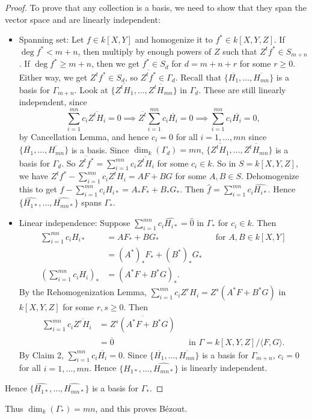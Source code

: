 \documentclass[12pt]{article}
\newcommand{\vbrack}[1]{\langle #1\rangle}
\theoremstyle{definition}
\begin{document}
\begin{proof}
    To prove that any collection is a basis, we need to show that they span the vector space and are linearly independent:
    \begin{itemize}
        \item Spanning set: Let $f\in k[X,Y]$ and homogenize it to $f^*\in k[X,Y,Z]$. If $\deg f^*<m+n$, then multiply by enough powers of $Z$ such that $Z^tf^*\in S_{m+n}$. If $\deg f^*\geq m+n$, then we get $f^*\in S_d$ for $d=m+n+r$ for some $r\geq0$. Either way, we get $Z^tf^*\in S_d$, so $\overline{Z^tf^*}\in\Gamma_d$. Recall that $\{\overline{H_1},\dotsc,\overline{H_{mn}}\}$ is a basis for $\Gamma_{m+n}$. Look at $\{\overline{Z^tH_1},\dotsc,\overline{Z^tH_{mn}}\}$ in $\Gamma_d$. These are still linearly independent, since
        \[\sum\limits_{i=1}^{mn}c_i\overline{Z^tH_i}=0\implies\overline{Z^t}\sum\limits_{i=1}^{mn}c_i\overline{H_i}=0\implies\sum\limits_{i=1}^{mn}c_i\overline{H_i}=0,\]
        by Cancellation Lemma, and hence $c_i=0$ for all $i=1,\dotsc,mn$ since $\{\overline{H_1},\dotsc,\overline{H_{mn}}\}$ is a basis. Since $\dim_k(\Gamma_d)=mn$, $\{\overline{Z^tH_1},\dotsc,\overline{Z^tH_{mn}}\}$ is a basis for $\Gamma_d$. So $\overline{Z^tf^*}=\sum\limits_{i=1}^{mn}c_i\overline{Z^tH_i}$ for some $c_i\in k$. So in $S=k[X,Y,Z]$, we have $Z^tf^*-\sum\limits_{i=1}^{mn}c_iZ^tH_i=AF+BG$ for some $A,B\in S$. Dehomogenize this to get $f-\sum\limits_{i=1}^{mn}c_iH_{i*}=A_*F_*+B_*G_*$. Then $\hat{f}=\sum\limits_{i=1}^{mn}c_i\widehat{H_{i*}}$. Hence $\{\widehat{H_{1*}},\dotsc,\widehat{H_{mn*}}\}$ spans $\Gamma_*$. \checkmark
        \item Linear independence: Suppose $\sum\limits_{i=1}^{mn}c_i\widehat{H_{i*}}=\hat{0}$ in $\Gamma_*$ for $c_i\in k$. Then
        \begin{align*}
            \sum\limits_{i=1}^{mn}c_iH_{i*}&=AF_*+BG_*&&\text{for }A,B\in k[X,Y]\\
            &=(A^*)_*F_*+(B^*)_*G_*\\
            \left(\sum\limits_{i=1}^{mn}c_iH_i\right)_*&=(A^*F+B^*G)_*.
        \end{align*}
        By the Rehomogenization Lemma, $\sum\limits_{i=1}^{mn}c_iZ^rH_i=Z^s(A^*F+B^*G)$ in $k[X,Y,Z]$ for some $r,s\geq0$. Then
        \begin{align*}
            \sum\limits_{i=1}^{mn}c_i\overline{Z^rH_i}&=\overline{Z^s(A^*F+B^*G)}\\
            &=\overline{0}&&\text{in }\Gamma=k[X,Y,Z]/\vbrack{F,G}.
        \end{align*}
        By Claim 2, $\sum\limits_{i=1}^{mn}c_i\overline{H_i}=0$. Since $\{\overline{H_1},\dotsc,\overline{H_{mn}}\}$ is a basis for $\Gamma_{m+n}$, $c_i=0$ for all $i=1,\dotsc,mn$. Hence $\{\widehat{H_{1*}},\dotsc,\widehat{H_{mn*}}\}$ is linearly independent. \checkmark
    \end{itemize}
    Hence $\{\widehat{H_{1*}},\dotsc,\widehat{H_{mn*}}\}$ is a basis for $\Gamma_*$.
\end{proof}
Thus $\dim_k(\Gamma_*)=mn$, and this proves B\'ezout.
\end{document}
